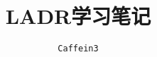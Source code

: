 \documentclass[b5paper]{ctexrep}
\begin{document}
\title{LADR学习笔记}
\author{\texttt{Caffein3}}
\date{}
\maketitle
\tableofcontents




\end{document}
